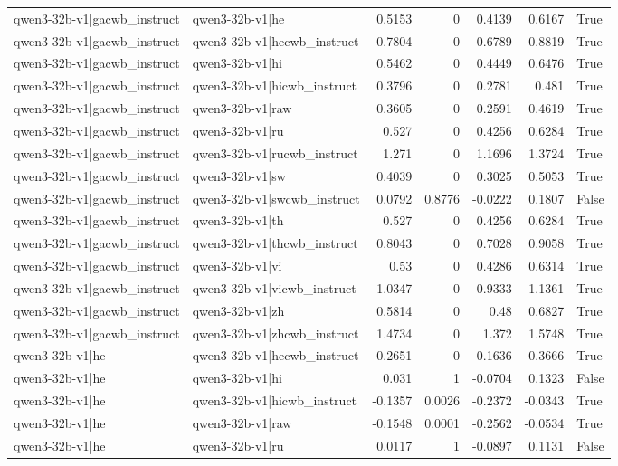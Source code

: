 \begin{table}
\begin{tabular}{l l r r r r l}
qwen3-32b-v1|gacwb_instruct & qwen3-32b-v1|he & 0.5153 & 0 & 0.4139 & 0.6167 & True \\
qwen3-32b-v1|gacwb_instruct & qwen3-32b-v1|hecwb_instruct & 0.7804 & 0 & 0.6789 & 0.8819 & True \\
qwen3-32b-v1|gacwb_instruct & qwen3-32b-v1|hi & 0.5462 & 0 & 0.4449 & 0.6476 & True \\
qwen3-32b-v1|gacwb_instruct & qwen3-32b-v1|hicwb_instruct & 0.3796 & 0 & 0.2781 & 0.481 & True \\
qwen3-32b-v1|gacwb_instruct & qwen3-32b-v1|raw & 0.3605 & 0 & 0.2591 & 0.4619 & True \\
qwen3-32b-v1|gacwb_instruct & qwen3-32b-v1|ru & 0.527 & 0 & 0.4256 & 0.6284 & True \\
qwen3-32b-v1|gacwb_instruct & qwen3-32b-v1|rucwb_instruct & 1.271 & 0 & 1.1696 & 1.3724 & True \\
qwen3-32b-v1|gacwb_instruct & qwen3-32b-v1|sw & 0.4039 & 0 & 0.3025 & 0.5053 & True \\
qwen3-32b-v1|gacwb_instruct & qwen3-32b-v1|swcwb_instruct & 0.0792 & 0.8776 & -0.0222 & 0.1807 & False \\
qwen3-32b-v1|gacwb_instruct & qwen3-32b-v1|th & 0.527 & 0 & 0.4256 & 0.6284 & True \\
qwen3-32b-v1|gacwb_instruct & qwen3-32b-v1|thcwb_instruct & 0.8043 & 0 & 0.7028 & 0.9058 & True \\
qwen3-32b-v1|gacwb_instruct & qwen3-32b-v1|vi & 0.53 & 0 & 0.4286 & 0.6314 & True \\
qwen3-32b-v1|gacwb_instruct & qwen3-32b-v1|vicwb_instruct & 1.0347 & 0 & 0.9333 & 1.1361 & True \\
qwen3-32b-v1|gacwb_instruct & qwen3-32b-v1|zh & 0.5814 & 0 & 0.48 & 0.6827 & True \\
qwen3-32b-v1|gacwb_instruct & qwen3-32b-v1|zhcwb_instruct & 1.4734 & 0 & 1.372 & 1.5748 & True \\
qwen3-32b-v1|he & qwen3-32b-v1|hecwb_instruct & 0.2651 & 0 & 0.1636 & 0.3666 & True \\
qwen3-32b-v1|he & qwen3-32b-v1|hi & 0.031 & 1 & -0.0704 & 0.1323 & False \\
qwen3-32b-v1|he & qwen3-32b-v1|hicwb_instruct & -0.1357 & 0.0026 & -0.2372 & -0.0343 & True \\
qwen3-32b-v1|he & qwen3-32b-v1|raw & -0.1548 & 0.0001 & -0.2562 & -0.0534 & True \\
qwen3-32b-v1|he & qwen3-32b-v1|ru & 0.0117 & 1 & -0.0897 & 0.1131 & False \\

\end{tabular}
\end{table}
